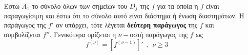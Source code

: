 Έστω $ A_1 $ το σύνολο όλων των σημείων του $ D_f $ της $ f $ για τα οποία η $ f $ είναι παραγωγίσιμη και έστω ότι το σύνολο αυτό είναι διάστημα ή ένωση διαστημάτων. Η παράγωγος της $ f' $ αν υπάρχει, τότε λέγεται \textbf{δεύτερη παράγωγος} της $ f $ και συμβολίζεται $ f'' $. Γενικότερα ορίζεται η $ \nu- $οστή παράγωγος της $ f $ ως
\[ f^{(\nu)}=\left[f^{(\nu-1)}\right]'\ \ ,\ \ \nu\geq 3 \]
